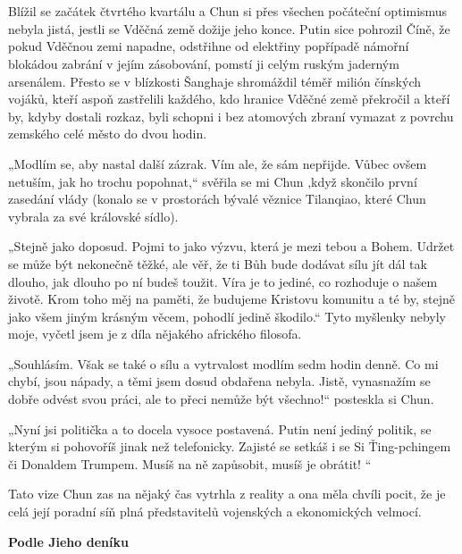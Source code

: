 \chapter{}

Blížil se začátek čtvrtého kvartálu a Chun si přes všechen počáteční optimismus nebyla jistá, jestli se Vděčná země dožije jeho konce. Putin sice pohrozil Číně, že pokud Vděčnou zemi napadne, odstřihne od elektřiny popřípadě námořní blokádou zabrání v jejím zásobování, pomstí ji celým ruským jaderným arsenálem. Přesto se v blízkosti Šanghaje shromáždil téměř milión čínských vojáků, kteří aspoň zastřelili každého, kdo hranice Vděčné země překročil a kteří by, kdyby dostali rozkaz, byli schopni i bez atomových zbraní vymazat z povrchu zemského celé město do dvou hodin.
	
„Modlím se, aby nastal další zázrak. Vím ale, že sám nepřijde. Vůbec ovšem netuším, jak ho trochu popohnat,“ svěřila se mi Chun ,když skončilo první zasedání vlády (konalo se v prostorách bývalé věznice Tilanqiao, které Chun vybrala za své královské sídlo).

„Stejně jako doposud. Pojmi to jako výzvu, která je mezi tebou a Bohem. Udržet se může být nekonečně těžké, ale věř, že ti Bůh bude dodávat sílu jít dál tak dlouho, jak dlouho po ní budeš toužit. Víra je to jediné, co rozhoduje o našem životě. Krom toho měj na paměti, že budujeme Kristovu komunitu a té by, stejně jako všem jiným krásným věcem, pohodlí jedině škodilo.“ Tyto myšlenky nebyly moje, vyčetl jsem je z díla nějakého afrického filosofa.	

„Souhlásím. Však se také o sílu a vytrvalost modlím sedm hodin denně. Co mi chybí, jsou nápady, a těmi jsem dosud obdařena nebyla. Jistě, vynasnažím se dobře odvést svou práci, ale to přeci nemůže být všechno!“ posteskla si Chun.

„Nyní jsi politička a to docela vysoce postavená. Putin není jediný politik, se kterým si pohovoříš jinak než telefonicky. Zajisté se setkáš i se Si Ťing-pchingem či Donaldem Trumpem. Musíš na ně zapůsobit, musíš je obrátit! “

Tato vize Chun zas na nějaký čas vytrhla z reality a ona měla chvíli pocit, že je celá její poradní síň plná představitelů vojenských a ekonomických velmocí. 

\vspace{0.75cm}
\textbf{Podle Jieho deníku}
\vspace{0.75cm}

